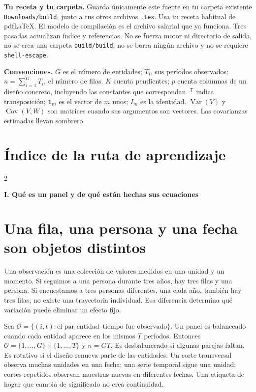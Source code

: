 \documentclass[11pt,a4paper]{article}
\newcommand{\T}{^{\mathsf T}}
\DeclareMathOperator{\Var}{Var}
\DeclareMathOperator{\Cov}{Cov}
\newcommand{\ones}{\mathbf 1}
\theoremstyle{definition}
\newcommand{\parte}[1]{\par\bigskip\Needspace{8\baselineskip}\begin{center}{\Large\bfseries\color{azul}#1}\end{center}}
\newcommand{\cO}{\mathcal O}
\begin{document}
\textbf{Tu receta y tu carpeta.} Guarda únicamente este fuente en tu carpeta existente \texttt{Downloads/build}, junto a tus otros archivos \texttt{.tex}. Usa tu receta habitual de pdfLaTeX. El modelo de compilación es el archivo salarial que ya funciona. Tres pasadas actualizan índice y referencias. No se fuerza motor ni directorio de salida, no se crea una carpeta \texttt{build/build}, no se borra ningún archivo y no se requiere \texttt{shell-escape}.

\textbf{Convenciones.} $G$ es el número de entidades; $T_i$, sus períodos observados; $n=\sum_{i=1}^G T_i$, el número de filas. $K$ cuenta pendientes; $p$ cuenta columnas de un diseño concreto, incluyendo las constantes que correspondan. $\T$ indica transposición; $\ones_m$ es el vector de $m$ unos; $I_m$ es la identidad. $\Var(V)$ y $\Cov(V,W)$ son matrices cuando sus argumentos son vectores. Las covarianzas estimadas llevan sombrero.
\setcounter{tocdepth}{1}
\section*{Índice de la ruta de aprendizaje}
\begin{multicols}{2}\footnotesize\setlength{\parskip}{0pt}
\makeatletter
\renewcommand*\l@section[2]{\@dottedtocline{1}{0pt}{2.5em}{#1}{#2}}
\makeatother
\end{multicols}

\parte{I. Qué es un panel y de qué están hechas sus ecuaciones}
\section{Una fila, una persona y una fecha son objetos distintos}
Una observación es una colección de valores medidos en una unidad y un momento. Si seguimos a una persona durante tres años, hay tres filas y una persona. Si encuestamos a tres personas diferentes, una cada año, también hay tres filas; no existe una trayectoria individual. Esa diferencia determina qué variación puede eliminar un efecto fijo.

Sea $\cO=\{(i,t):\text{el par entidad--tiempo fue observado}\}$. Un panel es balanceado cuando cada entidad aparece en los mismos $T$ períodos. Entonces $\cO=\{1,\ldots,G\}\times\{1,\ldots,T\}$ y $n=GT$. Es desbalanceado si algunas parejas faltan. Es rotativo si el diseño renueva parte de las entidades. Un corte transversal observa muchas unidades en una fecha; una serie temporal sigue una unidad; cortes repetidos observan muestras nuevas en diferentes fechas. Una etiqueta de hogar que cambia de significado no crea continuidad.
\end{document}
